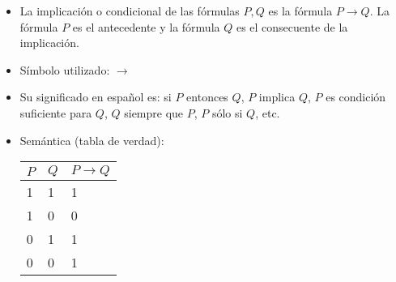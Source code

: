 \documentclass[letterpaper,11pt]{article}
\begin{document}
\begin{enumerate}
\begin{itemize}
\begin{itemize}
                \begin{itemize}
                    \item La implicación o condicional de las fórmulas $P, Q$
                    es la fórmula $P \rightarrow Q$. La fórmula $P$ es el 
                    antecedente y la fórmula $Q$ es el consecuente de la 
                    implicación.
                    \item Símbolo utilizado: $\rightarrow$
                    \item Su significado en español es: si $P$ entonces $Q$,
                    $P$ implica $Q$, $P$ es condición suficiente para $Q$,
                    $Q$ siempre que $P$, $P$ sólo si $Q$, etc.
                    \item Semántica (tabla de verdad):
                    \begin{table}[htbp]
                        \begin{center}
                        \begin{tabular}{|l|l|l|}
                        \hline
                        $P$ & $Q$ & $P \rightarrow Q$ \\
                        \hline \hline 
                        1 & 1 & 1 \\ \hline
                        1 & 0 & 0 \\ \hline
                        0 & 1 & 1 \\ \hline
                        0 & 0 & 1 \\  \hline
                        \end{tabular}
                        \end{center}
                    \end{table}
                \end{itemize}


\end{itemize}
\end{itemize}
\end{enumerate}
\end{document}
